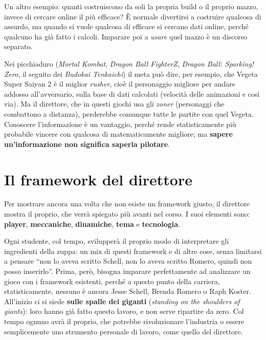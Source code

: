 Un altro esempio: quanti costruiscono da soli la propria build o il proprio
mazzo, invece di cercare online il più efficace? È normale divertirsi a
costruire qualcosa di assurdo, ma quando si vuole qualcosa di efficace si
cercano dati online, perché qualcuno ha già fatto i calcoli. Imparare poi a
\emph{usare} quel mazzo è un discorso separato.

Nei picchiaduro (\emph{Mortal Kombat}, \emph{Dragon Ball FighterZ},
\emph{Dragon Ball: Sparking! Zero}, il seguito dei \emph{Budokai Tenkaichi})
il meta può dire, per esempio, che Vegeta Super Saiyan 2 è il miglior
\emph{rusher}, cioè il personaggio migliore per andare addosso all'avversario,
sulla base di dati calcolati (velocità delle animazioni e così via). Ma il
direttore, che in questi giochi usa gli \emph{zoner} (personaggi che combattono
a distanza), perderebbe comunque tutte le partite con quel Vegeta. Conoscere
l'informazione è un vantaggio, perché rende statisticamente più probabile
vincere con qualcosa di matematicamente migliore; ma \textbf{sapere
un'informazione non significa saperla pilotare}.

\section{Il framework del direttore}
\label{sec:framework-direttore}

Per mostrare ancora una volta che non esiste un framework giusto, il direttore
mostra il proprio, che verrà spiegato più avanti nel corso. I suoi elementi
sono: \textbf{player}, \textbf{meccaniche}, \textbf{dinamiche},
\textbf{tema} e \textbf{tecnologia}.

Ogni studente, col tempo, svilupperà il proprio modo di interpretare gli
ingredienti della zuppa: un mix di questi framework e di altre cose, senza
limitarsi a pensare ``non lo aveva scritto Schell, non lo aveva scritto Romero,
quindi non posso inserirlo''. Prima, però, bisogna imparare perfettamente ad
analizzare un gioco con i framework esistenti, perché a questo punto della
carriera, statisticamente, nessuno è ancora Jesse Schell, Brenda Romero o Raph
Koster. All'inizio ci si siede \textbf{sulle spalle dei giganti}
(\emph{standing on the shoulders of giants}): loro hanno già fatto questo
lavoro, e non serve ripartire da zero. Col tempo ognuno avrà il proprio, che
potrebbe rivoluzionare l'industria o essere semplicemente uno strumento
personale di lavoro, come quello del direttore.

